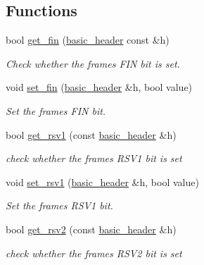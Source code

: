 \subsection*{Functions}
\begin{DoxyCompactItemize}
\item 
bool \hyperlink{namespacewebsocketpp_1_1frame_a66b39e273681d8509128e420cfaef6b0}{get\+\_\+fin} (\hyperlink{structwebsocketpp_1_1frame_1_1basic__header}{basic\+\_\+header} const \&h)
\begin{DoxyCompactList}\small\item\em Check whether the frame\textquotesingle{}s F\+IN bit is set. \end{DoxyCompactList}\item 
void \hyperlink{namespacewebsocketpp_1_1frame_abe746242507916e5d6ae2ca26bd9f69e}{set\+\_\+fin} (\hyperlink{structwebsocketpp_1_1frame_1_1basic__header}{basic\+\_\+header} \&h, bool value)
\begin{DoxyCompactList}\small\item\em Set the frame\textquotesingle{}s F\+IN bit. \end{DoxyCompactList}\item 
bool \hyperlink{namespacewebsocketpp_1_1frame_a90556de9dd71c1f063153b791abeb81c}{get\+\_\+rsv1} (const \hyperlink{structwebsocketpp_1_1frame_1_1basic__header}{basic\+\_\+header} \&h)
\begin{DoxyCompactList}\small\item\em check whether the frame\textquotesingle{}s R\+S\+V1 bit is set \end{DoxyCompactList}\item 
void \hyperlink{namespacewebsocketpp_1_1frame_ab706b1d5ef7de377671547993eb35062}{set\+\_\+rsv1} (\hyperlink{structwebsocketpp_1_1frame_1_1basic__header}{basic\+\_\+header} \&h, bool value)
\begin{DoxyCompactList}\small\item\em Set the frame\textquotesingle{}s R\+S\+V1 bit. \end{DoxyCompactList}\item 
bool \hyperlink{namespacewebsocketpp_1_1frame_a531509bc14ee0a6641662b17d5670460}{get\+\_\+rsv2} (const \hyperlink{structwebsocketpp_1_1frame_1_1basic__header}{basic\+\_\+header} \&h)
\begin{DoxyCompactList}\small\item\em check whether the frame\textquotesingle{}s R\+S\+V2 bit is set \end{DoxyCompactList}\item 

\end{DoxyCompactItemize}
